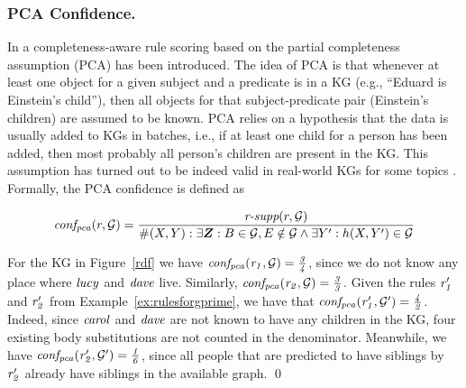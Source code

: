 \subsubsection{PCA Confidence.} In \cite{amie} a completeness-aware rule scoring based
on the partial completeness assumption (PCA) has been introduced. The idea of PCA is that
whenever at least one object for a given subject and a predicate is in a KG (e.g., ``Eduard
is Einstein’s child''), then all objects for that subject-predicate pair (Einstein’s children)
are assumed to be known. PCA relies on a hypothesis that the data is usually
added to KGs in batches, i.e., if at least one child for a person has been added, then most probably
all person's children are present in the KG. This assumption has turned out to be indeed valid in real-world KGs for some topics \cite{amie}. 
Formally, 
the PCA confidence is defined as

\[
\mi{conf_{pca}}(r, \cG) = \frac{\textit{r-supp}(r, \cG)}{\#(X,Y): \exists \vec{Z}: B \in \cG, E \notin \cG  \wedge \exists Y': h(X,Y')\in \cG}
\]
\begin{example}
For the KG in Figure~\ref{rdf} we have $\mathit{conf_{pca}(r_1,\mathcal{G}) = \frac{3}{4}}$, since we do not know any place where $\mathit{lucy}$ and $\mathit{dave}$ live. Similarly, $\mathit{conf_{pca}(r_2,\mathcal{G}) = \frac{3}{3}}$.
Given the rules $\mathit{r_1'}$ and $\mathit{r_2'}$ from Example~\ref{ex:rulesforgprime}, we have that $\mathit{conf_{pca}(r_1',\mathcal{G}') = \frac{4}{2}}$. Indeed, since $\mathit{carol}$ and $\mathit{dave}$ are not known
to have any children in the KG, four existing body substitutions are not counted in the
denominator. Meanwhile, we have $\mathit{conf_{pca}(r_2', \mathcal{G}') = \frac{1}{6}}$, since all people that are predicted to have siblings by $\mathit{r_2'}$ already have siblings in the available graph.
\qed
\end{example}

